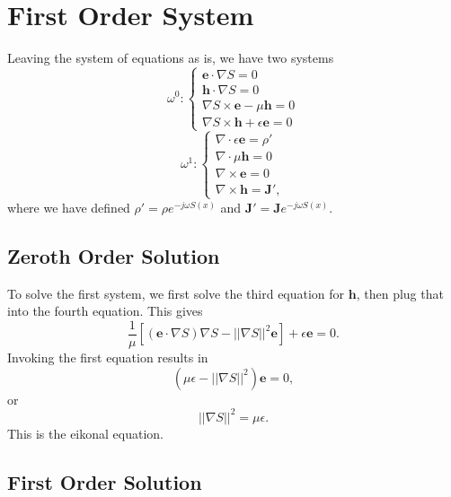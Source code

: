 \documentclass{article}
\newcommand{\norm}[1]{||#1||}
\newcommand{\Div}[0]{\nabla\cdot}
\newcommand{\Curl}[0]{\nabla\times}
\theoremstyle{plain}
\begin{document}
\section{First Order System}

Leaving the system of equations as is, we have two systems
\begin{equation}
	\omega^0:
	\begin{cases}
		\mathbf{e}\cdot\nabla S = 0 \\
		\mathbf{h}\cdot\nabla S = 0 \\
		\nabla S\times\mathbf{e} - \mu\mathbf{h} = 0 \\
		\nabla S\times\mathbf{h} + \epsilon\mathbf{e} = 0
	\end{cases}
\end{equation}
\begin{equation}
	\omega^1:
	\begin{cases}
		\Div\epsilon\mathbf{e} = \rho' \\
		\Div\mu\mathbf{h} = 0 \\
		\Curl\mathbf{e} = 0 \\
		\Curl\mathbf{h} = \mathbf{J}',
	\end{cases}
\end{equation}
where we have defined $\rho' = \rho e^{-j\omega S(x)}$ and $\mathbf{J}' = \mathbf{J}e^{-j\omega S(x)}$.


\subsection{Zeroth Order Solution}

To solve the first system, we first solve the third equation for $\mathbf{h}$, then plug that into the fourth equation. This gives
\begin{equation}
	\frac{1}{\mu}\left[ \left(\mathbf{e}\cdot\nabla S\right)\nabla S - \norm{\nabla S}^2\mathbf{e}\right] + \epsilon\mathbf{e} = 0.
\end{equation}
Invoking the first equation results in
\begin{equation}
	\left(\mu\epsilon - \norm{\nabla S}^2\right)\mathbf{e} = 0,
\end{equation}
or
\begin{equation}
	\norm{\nabla S}^2 = \mu\epsilon.
\end{equation}
This is the eikonal equation.




\subsection{First Order Solution}
\end{document}
